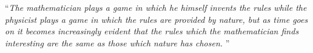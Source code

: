 \documentclass[
11pt, %
english, %
singlespacing, %
headsepline, %
]{MastersDoctoralThesis} %
\theoremstyle{TheoremStyle}
\theoremstyle{ExampleAndRemarkStyle}
\theoremstyle{ProofStyle}
\begin{document}
%
%
% 
% 

\cleardoublepage


\vspace*{0.2\textheight}

\noindent\enquote{\itshape The mathematician plays a game in which he himself invents the rules while the physicist plays a game in which the rules are provided by nature, but as time goes on it becomes increasingly evident that the rules which the mathematician finds interesting are the same as those which nature has chosen. }\bigbreak
\end{document}
